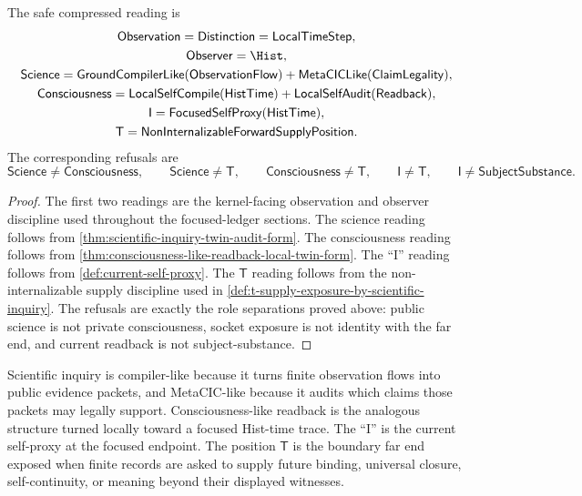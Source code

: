 \begin{corollary}
\label{cor:public-local-reflective-compilation-safe-reading}
The safe compressed reading is
$$
\begin{gathered}
\mathsf{Observation}=\mathsf{Distinction}=\mathsf{LocalTimeStep},\\
\mathsf{Observer}=\Hist,\\
\mathsf{Science}
=
\mathsf{GroundCompilerLike}(\mathsf{ObservationFlow})
+
\mathsf{MetaCICLike}(\mathsf{ClaimLegality}),\\
\mathsf{Consciousness}
=
\mathsf{LocalSelfCompile}(\mathsf{HistTime})
+
\mathsf{LocalSelfAudit}(\mathsf{Readback}),\\
\mathsf{I}
=
\mathsf{FocusedSelfProxy}(\mathsf{HistTime}),\\
\mathsf{T}
=
\mathsf{NonInternalizableForwardSupplyPosition}.
\end{gathered}
$$
The corresponding refusals are
$$
\mathsf{Science}\neq\mathsf{Consciousness},
\qquad
\mathsf{Science}\neq\mathsf{T},
\qquad
\mathsf{Consciousness}\neq\mathsf{T},
\qquad
\mathsf{I}\neq\mathsf{T},
\qquad
\mathsf{I}\neq\mathsf{SubjectSubstance}.
$$
\end{corollary}

\begin{proof}
The first two readings are the kernel-facing observation and observer
discipline used throughout the focused-ledger sections. The science
reading follows from \autoref{thm:scientific-inquiry-twin-audit-form}.
The consciousness reading follows from
\autoref{thm:consciousness-like-readback-local-twin-form}. The ``I''
reading follows from \autoref{def:current-self-proxy}. The
$\mathsf{T}$ reading follows from the non-internalizable supply discipline
used in \autoref{def:t-supply-exposure-by-scientific-inquiry}. The
refusals are exactly the role separations proved above: public science is
not private consciousness, socket exposure is not identity with the far
end, and current readback is not subject-substance.
\end{proof}

\begin{remark}[Reading]
\label{rem:public-local-reflective-compilation-reading}
Scientific inquiry is compiler-like because it turns finite observation
flows into public evidence packets, and MetaCIC-like because it audits
which claims those packets may legally support. Consciousness-like
readback is the analogous structure turned locally toward a focused
Hist-time trace. The ``I'' is the current self-proxy at the focused
endpoint. The position $\mathsf{T}$ is the boundary far end exposed when
finite records are asked to supply future binding, universal closure,
self-continuity, or meaning beyond their displayed witnesses.
\end{remark}

